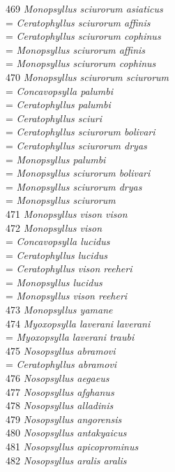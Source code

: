 \documentclass[
]{article}
\begin{document}
469 \emph{Monopsyllus sciurorum asiaticus}\\
= \emph{Ceratophyllus sciurorum affinis}\\
= \emph{Ceratophyllus sciurorum cophinus}\\
= \emph{Monopsyllus sciurorum affinis}\\
= \emph{Monopsyllus sciurorum cophinus}\\
470 \emph{Monopsyllus sciurorum sciurorum}\\
= \emph{Concavopsylla palumbi}\\
= \emph{Ceratophyllus palumbi}\\
= \emph{Ceratophyllus sciuri}\\
= \emph{Ceratophyllus sciurorum bolivari}\\
= \emph{Ceratophyllus sciurorum dryas}\\
= \emph{Monopsyllus palumbi}\\
= \emph{Monopsyllus sciurorum bolivari}\\
= \emph{Monopsyllus sciurorum dryas}\\
= \emph{Monopsyllus sciurorum}\\
471 \emph{Monopsyllus vison vison}\\
472 \emph{Monopsyllus vison}\\
= \emph{Concavopsylla lucidus}\\
= \emph{Ceratophyllus lucidus}\\
= \emph{Ceratophyllus vison reeheri}\\
= \emph{Monopsyllus lucidus}\\
= \emph{Monopsyllus vison reeheri}\\
473 \emph{Monopsyllus yamane}\\
474 \emph{Myoxopsylla laverani laverani}\\
= \emph{Myoxopsylla laverani traubi}\\
475 \emph{Nosopsyllus abramovi}\\
= \emph{Ceratophyllus abramovi}\\
476 \emph{Nosopsyllus aegaeus}\\
477 \emph{Nosopsyllus afghanus}\\
478 \emph{Nosopsyllus alladinis}\\
479 \emph{Nosopsyllus angorensis}\\
480 \emph{Nosopsyllus antakyaicus}\\
481 \emph{Nosopsyllus apicoprominus}\\
482 \emph{Nosopsyllus aralis aralis}\\
\end{document}
